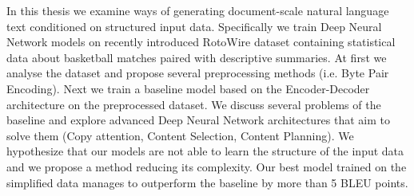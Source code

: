 \documentclass[12pt]{report}
\begin{document}

In this thesis we examine ways of generating document-scale natural language text conditioned on structured input data. Specifically we train Deep Neural Network models on recently introduced RotoWire dataset containing statistical data about basketball matches paired with descriptive summaries. At first we analyse the dataset and propose several preprocessing methods (i.e. Byte Pair Encoding). Next we train a baseline model based on the Encoder-Decoder architecture on the preprocessed dataset. We discuss several problems of the baseline and explore advanced Deep Neural Network architectures that aim to solve them (Copy attention, Content Selection, Content Planning). We hypothesize that our models are not able to learn the structure of the input data and we propose a method reducing its complexity. Our best model trained on the simplified data manages to outperform the baseline by more than 5 BLEU points.
\end{document}
